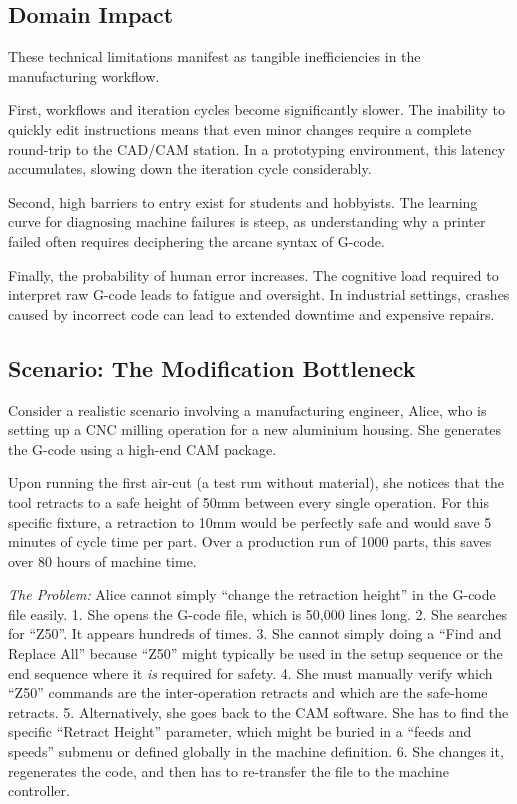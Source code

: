 \subsection{Domain Impact}

These technical limitations manifest as tangible inefficiencies in the manufacturing workflow.

First, workflows and iteration cycles become significantly slower. The inability to quickly edit instructions means that even minor changes require a complete round-trip to the CAD/CAM station. In a prototyping environment, this latency accumulates, slowing down the iteration cycle considerably.

Second, high barriers to entry exist for students and hobbyists. The learning curve for diagnosing machine failures is steep, as understanding why a printer failed often requires deciphering the arcane syntax of G-code.

Finally, the probability of human error increases. The cognitive load required to interpret raw G-code leads to fatigue and oversight. In industrial settings, crashes caused by incorrect code can lead to extended downtime and expensive repairs.

\subsection{Scenario: The Modification Bottleneck}

Consider a realistic scenario involving a manufacturing engineer, Alice, who is setting up a CNC milling operation for a new aluminium housing. She generates the G-code using a high-end CAM package.

Upon running the first air-cut (a test run without material), she notices that the tool retracts to a safe height of 50mm between every single operation. For this specific fixture, a retraction to 10mm would be perfectly safe and would save 5 minutes of cycle time per part. Over a production run of 1000 parts, this saves over 80 hours of machine time.

\textit{The Problem:} Alice cannot simply ``change the retraction height'' in the G-code file easily.
1. She opens the G-code file, which is 50,000 lines long.
2. She searches for ``Z50''. It appears hundreds of times.
3. She cannot simply doing a ``Find and Replace All'' because ``Z50'' might typically be used in the setup sequence or the end sequence where it \textit{is} required for safety.
4. She must manually verify which ``Z50'' commands are the inter-operation retracts and which are the safe-home retracts.
5. Alternatively, she goes back to the CAM software. She has to find the specific ``Retract Height'' parameter, which might be buried in a ``feeds and speeds'' submenu or defined globally in the machine definition.
6. She changes it, regenerates the code, and then has to re-transfer the file to the machine controller.

